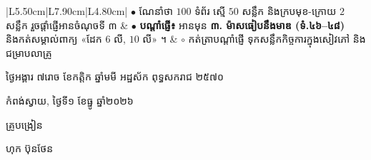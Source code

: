 \documentclass[a4paper,10pt]{article}
\begin{document}
{\begin{longtable}{|L{5.50cm}|L{7.90cm}|L{4.80cm}|}
$\bullet$ ណែនាំថា $100$ ទំព័រ ស្មើ $50$ សន្លឹក និងក្របមុខ-ក្រោយ $2$ សន្លឹក រួចផ្ដាំផ្ញើអានចំណុចទី ៣
&
$\bullet$ \textbf{បណ្ដាំផ្ញើ៖} អានមុន \textbf{៣. ម៉ាសធៀបនឹងមាឌ (ទំ.៤៦–៤៨)} និងកត់សម្គាល់ពាក្យ «ដែក $6$ លី, $10$ លី» ។
&
$\circ$ កត់ត្រាបណ្ដាំផ្ញើ ទុកសន្លឹកកិច្ចការក្នុងសៀវភៅ និងជម្រាបលាគ្រូ \\
\hline
\end{longtable}}

\vspace{6pt}
{\centering
\hspace*{5.2cm}\begin{minipage}{11.5cm}
  \centering
  ថ្ងៃអង្គារ ៧រោច ខែកត្តិក ឆ្នាំមមី អដ្ឋស័ក ពុទ្ធសករាជ ២៥៧០\par
  កំពង់ស្វាយ, ថ្ងៃទី១ ខែធ្នូ ឆ្នាំ២០២៦\par
  \vspace{2pt}
  {\muol គ្រូបង្រៀន\par}
  \vspace{32pt}
  \hfill{\muol ហុក ប៊ុនថែន}\hspace*{1.4cm}
\end{minipage}\par}
\end{document}
